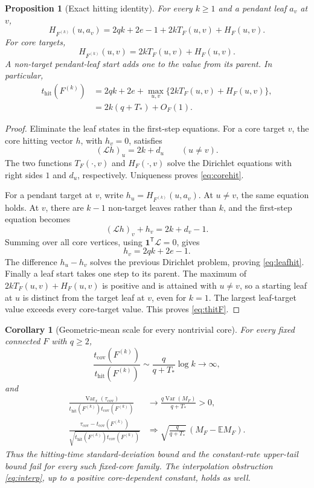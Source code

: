 \documentclass[11pt]{amsart}
\newtheorem{proposition}[theorem]{Proposition}
\newtheorem{corollary}[theorem]{Corollary}
\theoremstyle{remark}
\numberwithin{equation}{section}
\DeclareMathOperator{\Var}{Var}
\newcommand{\E}{\mathbb{E}}
\newcommand{\tcov}{t_{\mathrm{cov}}}
\newcommand{\thit}{t_{\mathrm{hit}}}
\newcommand{\taucov}{\tau_{\mathrm{cov}}}
\newcommand{\bone}{\mathbf{1}}
\newcommand{\Lap}{\mathcal{L}}
\newcommand{\T}{\mathsf{T}}
\begin{document}
\begin{proposition}[Exact hitting identity]\label{prop:hitting}
For every $k\ge 1$ and a pendant leaf $a_v$ at $v$,
\begin{equation}\label{eq:leafhit}
H_{F^{(k)}}(u,a_v)=2qk+2e-1+2kT_F(u,v)+H_F(u,v).
\end{equation}
For core targets,
\begin{equation}\label{eq:corehit}
H_{F^{(k)}}(u,v)=2kT_F(u,v)+H_F(u,v).
\end{equation}
A non-target pendant-leaf start adds one to the value from its parent. In particular,
\begin{align}
\thit(F^{(k)})&=2qk+2e+\max_{u,v}\{2kT_F(u,v)+H_F(u,v)\},\label{eq:thitF}\\
&=2k(q+T_*)+O_F(1).\label{eq:thitFasym}
\end{align}
\end{proposition}

\begin{proof}
Eliminate the leaf states in the first-step equations. For a core target $v$, the core hitting vector $h$, with $h_v=0$, satisfies
\[
(\Lap h)_u=2k+d_u\qquad(u\ne v).
\]
The two functions $T_F(\cdot,v)$ and $H_F(\cdot,v)$ solve the Dirichlet equations with right sides $1$ and $d_u$, respectively. Uniqueness proves \eqref{eq:corehit}.

For a pendant target at $v$, write $h_u=H_{F^{(k)}}(u,a_v)$. At $u\ne v$, the same equation holds. At $v$, there are $k-1$ non-target leaves rather than $k$, and the first-step equation becomes
\[
(\Lap h)_v+h_v=2k+d_v-1.
\]
Summing over all core vertices, using $\bone^{\T}\Lap=0$, gives
\[
h_v=2qk+2e-1.
\]
The difference $h_u-h_v$ solves the previous Dirichlet problem, proving \eqref{eq:leafhit}. Finally a leaf start takes one step to its parent. The maximum of $2kT_F(u,v)+H_F(u,v)$ is positive and is attained with $u\ne v$, so a starting leaf at $u$ is distinct from the target leaf at $v$, even for $k=1$. The largest leaf-target value exceeds every core-target value. This proves \eqref{eq:thitF}.
\end{proof}

\begin{corollary}[Geometric-mean scale for every nontrivial core]\label{cor:geomean}
For every fixed connected $F$ with $q\ge 2$,
\[
\frac{\tcov(F^{(k)})}{\thit(F^{(k)})}\sim\frac{q}{q+T_*}\log k\longrightarrow\infty,
\]
and
\begin{align}
\frac{\Var_x(\taucov)}{\thit(F^{(k)})\tcov(F^{(k)})}&\longrightarrow\frac{q\Var(M_F)}{q+T_*}>0,\label{eq:geomeanvar}\\
\frac{\taucov-\tcov(F^{(k)})}{\sqrt{\thit(F^{(k)})\tcov(F^{(k)})}}&\Longrightarrow\sqrt{\frac{q}{q+T_*}}\,(M_F-\E M_F).\label{eq:geomeanlimit}
\end{align}
Thus the hitting-time standard-deviation bound and the constant-rate upper-tail bound fail for every such fixed-core family. The interpolation obstruction \eqref{eq:interp}, up to a positive core-dependent constant, holds as well.
\end{corollary}
\end{document}
